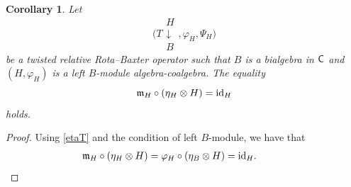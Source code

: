 \documentclass[pdftex]{sigma}
\numberwithin{equation}{section}
\newtheorem{Corollary}[Theorem]{Corollary}
\begin{document}
\begin{Corollary}
Let
\[
\Biggl(T\begin{array}{c}H\\\downarrow\\B\end{array},\varphi_{H},\Psi_{H}\Biggr)
\]
 be a twisted relative Rota--Baxter operator such that $B$ is a bialgebra in ${\sf C}$ and $(H,\varphi_{H})$ is a left $B$-module algebra-coalgebra. The equality
\begin{equation}\label{frakmHeta}
\mathfrak{m}_{H}\circ(\eta_{H}\otimes H)={\rm id}_{H}
\end{equation}
holds.
\end{Corollary}
\begin{proof}
Using \eqref{etaT} and the condition of left $B$-module, we have that
\begin{align*}
&\mathfrak{m}_{H}\circ(\eta_{H}\otimes H)=\varphi_{H}\circ(\eta_{B}\otimes H)={\rm id}_{H}.\tag*{\qed}
\end{align*}
\renewcommand{\qed}{}
\end{proof}
\end{document}
